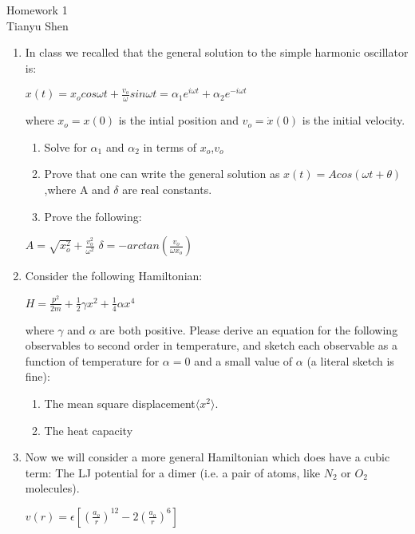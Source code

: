 \documentclass[12pt]{article}
\renewcommand{\baselinestretch}{1.0}
\begin{document}
\begin{center}
\large Homework 1\\
\small Tianyu Shen
\end{center}
\renewcommand{\baselinestretch}{1.5}
\scriptsize
\begin{enumerate}
\item In class we recalled that the general solution to the simple harmonic oscillator is:
	\begin{center}
	$x(t)=x_ocos\omega t+\frac{v_o}{\omega}sin\omega t={\alpha}_1
	 e^{i\omega t}+{\alpha}_2 e^{-i\omega t}$\\
	\end{center}
	where $x_o = x(0)$ is the intial position and $v_o = \dot{x}(0)$ is the initial velocity.
	\begin{enumerate}
	\item Solve for  ${\alpha}_1$ and ${\alpha}_2$ in terms of $x_o$,$v_o$
	\item Prove that one can write the general solution as $x(t) = A cos(\omega t + \theta )$
 	,where A and $\delta$ are real constants.
	\item Prove the following:
	\end{enumerate}
	\begin{center}
	$A=\sqrt{x_o^2}+\frac{v_o^2}{{\omega}^2}$ \qquad\qquad $\delta = -arctan(\frac{v_o}{\omega x_o})$
	\end{center}
\item Consider the following Hamiltonian:
	\begin{center}
	$H=\frac{p^2}{2m}+\frac{1}{2}\gamma x^2+\frac{1}{4}\alpha x^4$
	\end{center}
	where $\gamma$ and $\alpha$ are both positive. Please derive an equation for the following observables to second order in temperature, and sketch each observable as a function of temperature for $\alpha = 0$ and a small value of $\alpha$ (a literal sketch is fine):
	\begin{enumerate}
	\item The mean square displacement$ \langle x^2 \rangle. $
	\item The heat capacity
	\end{enumerate}
\item Now we will consider a more general Hamiltonian which does have a cubic term: The LJ potential for a dimer (i.e. a pair of atoms, like $N_2$ or $O_2$ molecules).
	\begin{center}
	$v(r)=\epsilon[(\frac{a_o}{r})^{12}-2(\frac{a_o}{r})^{6}]$\\

\end{center}
\end{enumerate}
\end{document}
